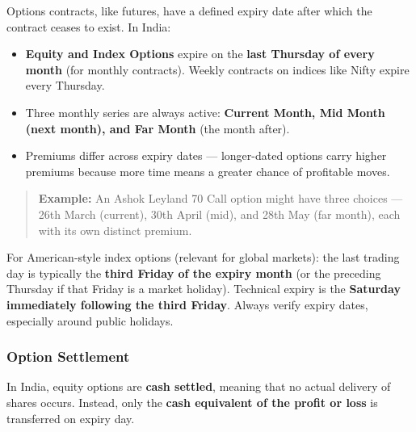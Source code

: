 \documentclass[12pt,openany]{book}
\begin{document}
Options contracts, like futures, have a defined expiry date after which the contract ceases to exist. In India:

\begin{itemize}[leftmargin=*]
    \item \textbf{Equity and Index Options} expire on the \textbf{last Thursday of every month} (for monthly contracts). Weekly contracts on indices like Nifty expire every Thursday.
    \item Three monthly series are always active: \textbf{Current Month, Mid Month (next month), and Far Month} (the month after).
    \item Premiums differ across expiry dates — longer-dated options carry higher premiums because more time means a greater chance of profitable moves.
\end{itemize}

\begin{quote}
\textbf{Example:} An Ashok Leyland 70 Call option might have three choices — 26th March (current), 30th April (mid), and 28th May (far month), each with its own distinct premium.
\end{quote}

For American-style index options (relevant for global markets): the last trading day is typically the \textbf{third Friday of the expiry month} (or the preceding Thursday if that Friday is a market holiday). Technical expiry is the \textbf{Saturday immediately following the third Friday}. Always verify expiry dates, especially around public holidays.

\subsubsection{Option Settlement}

In India, equity options are \textbf{cash settled}, meaning that no actual delivery of shares occurs. Instead, only the \textbf{cash equivalent of the profit or loss} is transferred on expiry day.
\end{document}
